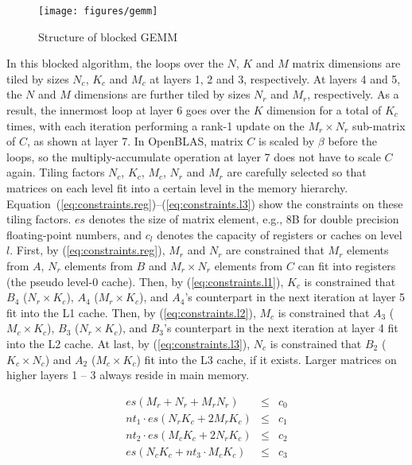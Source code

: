 \begin{figure}[t]
  \centering
  \texttt{[image: figures/gemm]}
  \caption{Structure of blocked GEMM}
  \label{fig:gemm}
\end{figure}

In this blocked algorithm, the loops over the $N$, $K$ and $M$
matrix dimensions are tiled by sizes $N_c$, $K_c$ and $M_c$ at 
layers 1, 2 and 3, respectively.
At layers 4 and 5, the $N$ and $M$ dimensions are further tiled by sizes
$N_r$ and $M_r$, respectively.
As a result, the innermost loop at layer 6 goes over the $K$
dimension for a total of $K_c$ times,
with each iteration performing a rank-1 update on
the $M_r \times N_r$ sub-matrix of $C$, as shown at layer 7.
In OpenBLAS, matrix $C$ is scaled by $\beta$ before the loops,
so the multiply-accumulate operation at layer 7 does not have to scale $C$ again.
Tiling factors $N_c$, $K_c$, $M_c$, $N_r$ and $M_r$ are carefully selected so that
matrices on each level fit into a certain level in the memory hierarchy.
Equation~(\ref{eq:constraints.reg})--(\ref{eq:constraints.l3}) show
the constraints on these tiling factors.
$es$ denotes the size of matrix element, e.g., 8B for double precision floating-point numbers,
and $c_l$ denotes the capacity of registers or caches on level $l$.
First, by (\ref{eq:constraints.reg}), $M_r$ and $N_r$ are constrained that $M_r$ elements from $A$,
$N_r$ elements from $B$ and $M_r \times N_r$ elements from $C$ can fit into registers
(the pseudo level-0 cache).
Then, by (\ref{eq:constraints.l1}), $K_c$ is constrained that $B_4$ ($N_r \times K_c$),
$A_4$ ($M_r \times K_c$), and $A_4$'s counterpart in the next iteration
at layer 5 fit into the L1 cache.
Then, by (\ref{eq:constraints.l2}), $M_c$ is constrained that $A_3$ ($M_c \times K_c$),
$B_3$ ($N_r \times K_c$), and $B_3$'s counterpart in the next iteration
at layer 4 fit into the L2 cache.
At last, by (\ref{eq:constraints.l3}), $N_c$ is constrained that 
$B_2$ ($K_c \times N_c$) and $A_2$ ($M_c \times K_c$) fit into the L3 cache, if it exists.
Larger matrices on higher layers 1 -- 3 always reside in main memory.

\begin{eqnarray}
  es (M_r + N_r + M_r N_r) & \le & c_{0} \label{eq:constraints.reg}\\
  nt_{1} \cdot es (N_r K_c + 2 M_r K_c) & \le & c_{1} \label{eq:constraints.l1}\\
  nt_{2} \cdot es (M_c K_c + 2 N_r K_c) & \le & c_{2} \label{eq:constraints.l2}\\
  es (N_c K_c + nt_{3} \cdot M_c K_c)   & \le & c_{3} \label{eq:constraints.l3}
\end{eqnarray}

